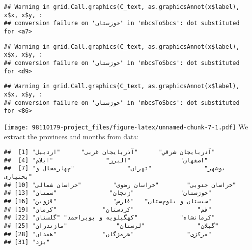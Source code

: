 \documentclass[
]{article}
\newenvironment{Shaded}{\begin{snugshade}}{\end{snugshade}}
\newcommand{\AttributeTok}[1]{\textcolor[rgb]{0.77,0.63,0.00}{#1}}
\newcommand{\FunctionTok}[1]{\textcolor[rgb]{0.00,0.00,0.00}{#1}}
\newcommand{\NormalTok}[1]{#1}
\newcommand{\OtherTok}[1]{\textcolor[rgb]{0.56,0.35,0.01}{#1}}
\newcommand{\SpecialCharTok}[1]{\textcolor[rgb]{0.00,0.00,0.00}{#1}}
\begin{document}
\begin{verbatim}
## Warning in grid.Call.graphics(C_text, as.graphicsAnnot(x$label), x$x, x$y, :
## conversion failure on 'خوزستان' in 'mbcsToSbcs': dot substituted for <a7>
\end{verbatim}

\begin{verbatim}
## Warning in grid.Call.graphics(C_text, as.graphicsAnnot(x$label), x$x, x$y, :
## conversion failure on 'خوزستان' in 'mbcsToSbcs': dot substituted for <d9>
\end{verbatim}

\begin{verbatim}
## Warning in grid.Call.graphics(C_text, as.graphicsAnnot(x$label), x$x, x$y, :
## conversion failure on 'خوزستان' in 'mbcsToSbcs': dot substituted for <86>
\end{verbatim}

\texttt{[image: 98110179-project\_files/figure-latex/unnamed-chunk-7-1.pdf]}
We extract the provinces and months from data:

\begin{Shaded}
\end{Shaded}

\begin{verbatim}
##  [1] "آذربايجان شرقي"      "آذربايجان غربی"      "اردبیل"             
##  [4] "اصفهان"              "البرز"               "ایلام"              
##  [7] "بوشهر"               "تهران"               "چهارمحال و بختیاری" 
## [10] "خراسان جنوبی"        "خراسان رضوی"         "خراسان شمالی"       
## [13] "خوزستان"             "زنجان"               "سمنان"              
## [16] "سیستان و بلوچستان"   "فارس"                "قزوین"              
## [19] "قم"                  "کردستان"             "کرمان"              
## [22] "کرمانشاه"            "کهگیلویه و بویراحمد" "گلستان"             
## [25] "گیلان"               "لرستان"              "مازندران"           
## [28] "مرکزی"               "هرمزگان"             "همدان"              
## [31] "یزد"
\end{verbatim}
\end{document}
